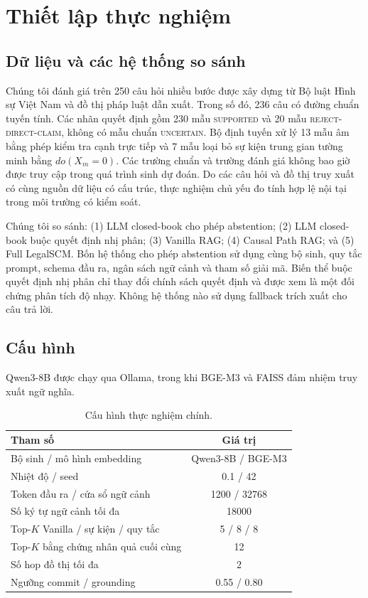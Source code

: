 \section{Thiết lập thực nghiệm}
\label{sec:experimental_setup}

\subsection{Dữ liệu và các hệ thống so sánh}

Chúng tôi đánh giá trên 250 câu hỏi nhiều bước được xây dựng từ Bộ luật Hình sự
Việt Nam \cite{blhs2025} và đồ thị pháp luật dẫn xuất. Trong số đó, 236 câu có
đường chuẩn tuyến tính. Các nhãn quyết định gồm 230 mẫu
\textsc{supported} và 20 mẫu \textsc{reject-direct-claim}, không có mẫu chuẩn
\textsc{uncertain}. Bộ định tuyến xử lý 13 mẫu âm bằng phép kiểm tra cạnh trực
tiếp và 7 mẫu loại bỏ sự kiện trung gian tường minh bằng $do(X_m=0)$. Các
trường chuẩn và trường đánh giá không bao giờ được truy cập trong quá trình sinh
dự đoán. Do các câu hỏi và đồ thị truy xuất có cùng nguồn dữ liệu có cấu trúc,
thực nghiệm chủ yếu đo tính hợp lệ nội tại trong môi trường có kiểm soát.

Chúng tôi so sánh: (1) LLM closed-book cho phép abstention; (2) LLM closed-book
buộc quyết định nhị phân; (3) Vanilla RAG; (4) Causal Path RAG; và (5) Full
LegalSCM. Bốn hệ thống cho phép abstention sử dụng cùng bộ sinh, quy tắc prompt,
schema đầu ra, ngân sách ngữ cảnh và tham số giải mã. Biến thể buộc quyết định
nhị phân chỉ thay đổi chính sách quyết định và được xem là một đối chứng phân
tích độ nhạy. Không hệ thống nào sử dụng fallback trích xuất cho câu trả lời.

\subsection{Cấu hình}

Qwen3-8B được chạy qua Ollama, trong khi BGE-M3
\cite{chen2024bgem3} và FAISS đảm nhiệm truy xuất ngữ nghĩa.

\begin{table}[t]
\centering
\caption{Cấu hình thực nghiệm chính.}
\label{tab:experimental_config}
\small
\begin{tabular}{lc}
\hline
\textbf{Tham số} & \textbf{Giá trị}\\
\hline
Bộ sinh / mô hình embedding & Qwen3-8B / BGE-M3\\
Nhiệt độ / seed & 0.1 / 42\\
Token đầu ra / cửa sổ ngữ cảnh & 1200 / 32768\\
Số ký tự ngữ cảnh tối đa & 18000\\
Top-$K$ Vanilla / sự kiện / quy tắc & 5 / 8 / 8\\
Top-$K$ bằng chứng nhân quả cuối cùng & 12\\
Số hop đồ thị tối đa & 2\\
Ngưỡng commit / grounding & 0.55 / 0.80\\
\hline
\end{tabular}
\end{table}


